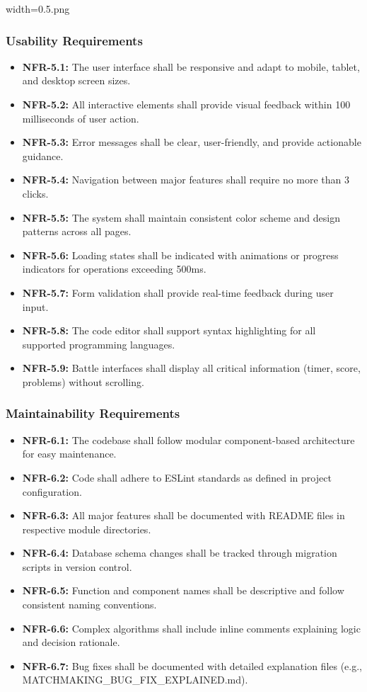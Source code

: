 width=0.5\linewidthimage.png\documentclass[12pt,a4paper]{article}
\begin{document}
\subsubsection{Usability Requirements}
\begin{itemize}
\item \textbf{NFR-5.1:} The user interface shall be responsive and adapt to mobile, tablet, and desktop screen sizes.
\item \textbf{NFR-5.2:} All interactive elements shall provide visual feedback within 100 milliseconds of user action.
\item \textbf{NFR-5.3:} Error messages shall be clear, user-friendly, and provide actionable guidance.
\item \textbf{NFR-5.4:} Navigation between major features shall require no more than 3 clicks.
\item \textbf{NFR-5.5:} The system shall maintain consistent color scheme and design patterns across all pages.
\item \textbf{NFR-5.6:} Loading states shall be indicated with animations or progress indicators for operations exceeding 500ms.
\item \textbf{NFR-5.7:} Form validation shall provide real-time feedback during user input.
\item \textbf{NFR-5.8:} The code editor shall support syntax highlighting for all supported programming languages.
\item \textbf{NFR-5.9:} Battle interfaces shall display all critical information (timer, score, problems) without scrolling.
\end{itemize}

\subsubsection{Maintainability Requirements}
\begin{itemize}
\item \textbf{NFR-6.1:} The codebase shall follow modular component-based architecture for easy maintenance.
\item \textbf{NFR-6.2:} Code shall adhere to ESLint standards as defined in project configuration.
\item \textbf{NFR-6.3:} All major features shall be documented with README files in respective module directories.
\item \textbf{NFR-6.4:} Database schema changes shall be tracked through migration scripts in version control.
\item \textbf{NFR-6.5:} Function and component names shall be descriptive and follow consistent naming conventions.
\item \textbf{NFR-6.6:} Complex algorithms shall include inline comments explaining logic and decision rationale.
\item \textbf{NFR-6.7:} Bug fixes shall be documented with detailed explanation files (e.g., MATCHMAKING\_BUG\_FIX\_EXPLAINED.md).
\end{itemize}
\end{document}

